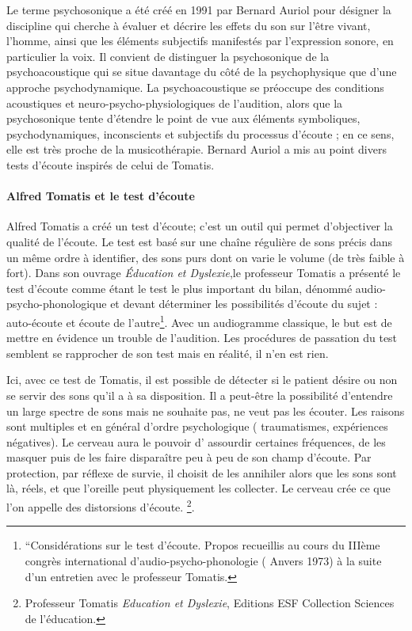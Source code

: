 Le terme psychosonique a été créé en 1991 par Bernard Auriol pour
désigner la discipline qui cherche à évaluer et décrire les effets du
son sur l'être vivant, l'homme, ainsi que les éléments
subjectifs manifestés par l'expression sonore, en particulier la voix.
Il convient de distinguer la psychosonique de la psychoacoustique qui
se situe davantage du côté de la psychophysique que d'une approche
psychodynamique. La psychoacoustique se préoccupe des conditions
acoustiques et neuro-psycho-physiologiques de l'audition, alors que la
psychosonique tente d'étendre le point de vue aux éléments
symboliques, psychodynamiques, inconscients et subjectifs du processus
d'écoute ;  en ce sens, elle est très proche de la musicothérapie.
Bernard Auriol a mis au point divers tests d'écoute inspirés de celui de Tomatis.
  
\paragraph{Alfred Tomatis et le test d'écoute}
  Alfred Tomatis a créé un test d'écoute; c'est un outil qui permet d'objectiver la qualité de l'écoute.
  Le test est  basé sur une chaîne régulière de sons précis dans un même ordre à identifier, des sons purs dont on varie le volume (de très faible à fort). Dans son ouvrage \emph{Éducation et Dyslexie},le professeur Tomatis
  a présenté le test d'écoute comme étant le test le plus important du
  bilan, dénommé audio-psycho-phonologique et devant déterminer les
  possibilités d'écoute du sujet : auto-écoute et écoute de
  l'autre\footnote{``Considérations sur le test d'écoute. Propos
  	recueillis au cours du IIIème congrès international
  	d'audio-psycho-phonologie ( Anvers 1973) à la suite d'un entretien
  	avec le professeur Tomatis.}. 
  Avec un audiogramme classique, le but est de mettre en évidence un trouble de l'audition. Les procédures de passation du test semblent se rapprocher de son test mais en réalité, il n'en est rien. 
  
  Ici, avec ce test de Tomatis, il est possible de détecter si le patient désire ou non se servir des sons
  qu'il a à sa disposition. Il a peut-être la possibilité d'entendre un large spectre de
  sons mais ne souhaite pas, ne veut pas les écouter. Les raisons sont multiples et en général d'ordre psychologique ( traumatismes,
  expériences négatives). Le cerveau aura le
  pouvoir d' assourdir certaines fréquences, de les masquer puis de les faire disparaître peu à peu de
  son champ d'écoute. Par protection, par réflexe de survie, il choisit de les
  annihiler alors que les sons sont là, réels, et que  l'oreille peut physiquement les collecter. Le cerveau crée ce
  que l'on appelle des distorsions d'écoute. \footnote{Professeur
    Tomatis \emph{Education et Dyslexie},  Editions ESF
    Collection Sciences de l'éducation.}. %

